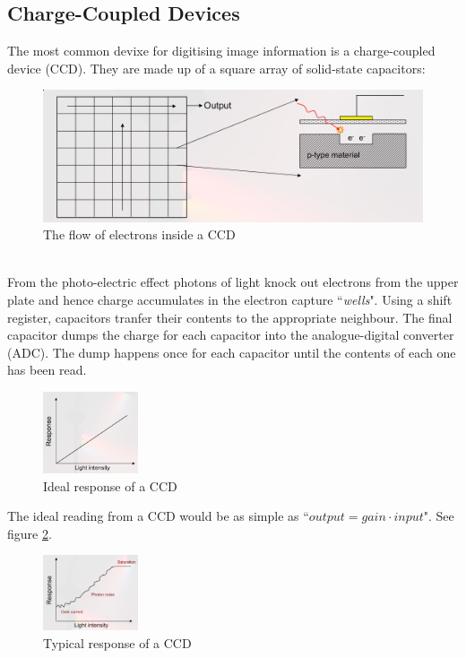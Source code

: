 \documentclass{article}
\begin{document}
\subsection{Charge-Coupled Devices}
The most common devixe for digitising image information is a charge-coupled device (CCD). 
They are made up of a square array of solid-state capacitors: \\
\begin{figure}[h]
	\centering
	\includegraphics[width=\textwidth]{ccd.png}
	\caption{The flow of electrons inside a CCD}
	\label{fig:CCD}
\end{figure} \\
From the photo-electric effect photons of light knock out electrons from the upper plate and hence charge accumulates in the electron capture ``{\it wells}".
Using a shift register, capacitors tranfer their contents to the appropriate neighbour.
The final capacitor dumps the charge for each capacitor into the analogue-digital converter (ADC).
The dump happens once for each capacitor until the contents of each one has been read. \\
\begin{figure}
	\includegraphics[width=0.25\textwidth]{ccdResponse1.png}
	\caption{Ideal response of a CCD}
	\label{fig:ccdResponse1}
\end{figure}
The ideal reading from a CCD would be as simple as ``$output = gain\cdot input$". See figure \ref{fig:ccdResponse1}. \\
\begin{figure}
	\includegraphics[width=0.25\textwidth]{ccdResponse2.png}
	\caption{Typical response of a CCD}
	\label{fig:ccdResponse2}
\end{figure}
\end{document}
